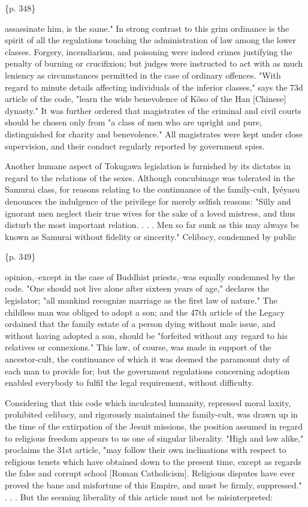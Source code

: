 \{p. 348\}

assassinate him, is the same." In strong contrast to this grim ordinance is the spirit of all the regulations touching the administration of law among the lower classes. Forgery, incendiarism, and poisoning were indeed crimes justifying the penalty of burning or crucifixion; but judges were instructed to act with as much leniency as circumstances permitted in the case of ordinary offences. "With regard to minute details affecting individuals of the inferior classes," says the 73d article of the code, "learn the wide benevolence of Kôso of the Han [Chinese] dynasty." It was further ordered that magistrates of the criminal and civil courts should be chosen only from "a class of men who are upright and pure, distinguished for charity and benevolence." All magistrates were kept under close supervision, and their conduct regularly reported by government spies.

Another humane aspect of Tokugawa legislation is furnished by its dictates in regard to the relations of the sexes. Although concubinage was tolerated in the Samurai class, for reasons relating to the continuance of the family-cult, Iyéyasu denounces the indulgence of the privilege for merely selfish reasons: "Silly and ignorant men neglect their true wives for the sake of a loved mistress, and thus disturb the most important relation. . . . Men so far sunk as this may always be known as Samurai without fidelity or sincerity." Celibacy, condemned by public

\{p. 349\}

opinion,--except in the case of Buddhist priests,--was equally condemned by the code. "One should not live alone after sixteen years of age," declares the legislator; "all mankind recognize marriage as the first law of nature." The childless man was obliged to adopt a son; and the 47th article of the Legacy ordained that the family estate of a person dying without male issue, and without having adopted a son, should be "forfeited without any regard to his relatives or connexions." This law, of course, was made in support of the ancestor-cult, the continuance of which it was deemed the paramount duty of each man to provide for; but the government regulations concerning adoption enabled everybody to fulfil the legal requirement, without difficulty.

Considering that this code which inculcated humanity, repressed moral laxity, prohibited celibacy, and rigorously maintained the family-cult, was drawn up in the time of the extirpation of the Jesuit missions, the position assumed in regard to religious freedom appears to us one of singular liberality. "High and low alike," proclaims the 31st article, "may follow their own inclinations with respect to religious tenets which have obtained down to the present time, except as regards the false and corrupt school [Roman Catholicism]. Religious disputes have ever proved the bane and misfortune of this Empire, and must be firmly, suppressed." . . . But the seeming liberality of this article must not be misinterpreted:

